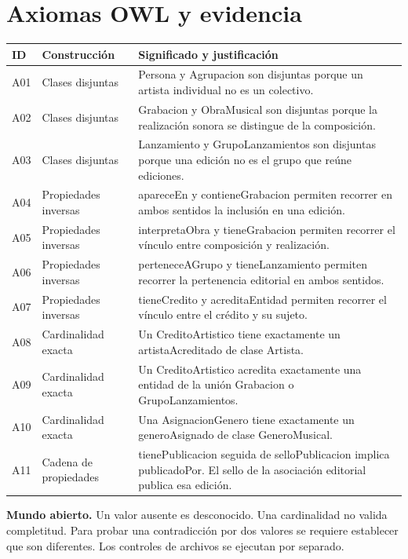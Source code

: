\documentclass[11pt,a4paper]{article}
\begin{document}
\section{Axiomas OWL y evidencia}
\begin{tabularx}{\textwidth}{@{}p{0.8cm}>{\raggedright\arraybackslash}p{3.2cm}Y@{}}\toprule
\textbf{ID} & \textbf{Construcción} & \textbf{Significado y justificación}\\\midrule
A01 & Clases disjuntas & Persona y Agrupacion son disjuntas porque un artista individual no es un colectivo.\\
A02 & Clases disjuntas & Grabacion y ObraMusical son disjuntas porque la realización sonora se distingue de la composición.\\
A03 & Clases disjuntas & Lanzamiento y GrupoLanzamientos son disjuntas porque una edición no es el grupo que reúne ediciones.\\
A04 & Propiedades inversas & apareceEn y contieneGrabacion permiten recorrer en ambos sentidos la inclusión en una edición.\\
A05 & Propiedades inversas & interpretaObra y tieneGrabacion permiten recorrer el vínculo entre composición y realización.\\
A06 & Propiedades inversas & perteneceAGrupo y tieneLanzamiento permiten recorrer la pertenencia editorial en ambos sentidos.\\
A07 & Propiedades inversas & tieneCredito y acreditaEntidad permiten recorrer el vínculo entre el crédito y su sujeto.\\
A08 & Cardinalidad exacta & Un CreditoArtistico tiene exactamente un artistaAcreditado de clase Artista.\\
A09 & Cardinalidad exacta & Un CreditoArtistico acredita exactamente una entidad de la unión Grabacion o GrupoLanzamientos.\\
A10 & Cardinalidad exacta & Una AsignacionGenero tiene exactamente un generoAsignado de clase GeneroMusical.\\
A11 & Cadena de propiedades & tienePublicacion seguida de selloPublicacion implica publicadoPor. El sello de la asociación editorial publica esa edición.\\\bottomrule
\end{tabularx}

\textbf{Mundo abierto.} Un valor ausente es desconocido. Una cardinalidad no valida completitud. Para probar una contradicción por dos valores se requiere establecer que son diferentes. Los controles de archivos se ejecutan por separado.
\end{document}

